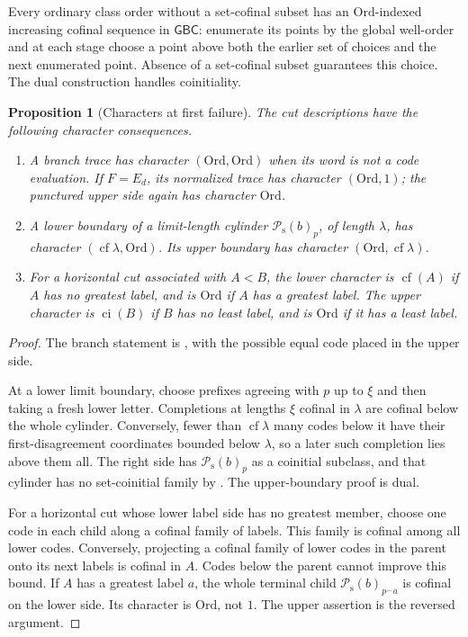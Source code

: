 \documentclass[11pt]{article}
\newtheorem{proposition}[proposition]{Proposition}
\theoremstyle{definition}
\theoremstyle{remark}
\newcommand{\Ord}{\mathrm{Ord}}
\newcommand{\Psupp}{\mathcal P_{\mathrm{s}}}
\newcommand{\cf}{\operatorname{cf}}
\newcommand{\cat}{\mathbin{{}^\frown}}
\newcommand{\GBC}{\mathsf{GBC}}
\newcommand{\ci}{\operatorname{ci}}
\begin{document}
Every ordinary class order without a set-cofinal subset has an
$\Ord$-indexed increasing cofinal sequence in $\GBC$: enumerate its
points by the global well-order and at each stage choose a point above
both the earlier set of choices and the next enumerated point. Absence
of a set-cofinal subset guarantees this choice. The dual construction
handles coinitiality.

\begin{proposition}[Characters at first failure]\label{swo:fs:prop:characters}
The cut descriptions have the following character consequences.
\begin{enumerate}[label=\textup{(\roman*)}]
\item A branch trace has character $(\Ord,\Ord)$ when its word is
not a code evaluation. If $F=E_d$, its normalized trace has character
$(\Ord,1)$; the punctured upper side again has character $\Ord$.
\item A lower boundary of a limit-length cylinder $\Psupp(b)_p$, of length
$\lambda$, has character $(\cf\lambda,\Ord)$. Its upper boundary
has character $(\Ord,\cf\lambda)$.
\item For a horizontal cut associated with $A<B$, the lower
character is $\cf(A)$ if $A$ has no greatest label, and is $\Ord$
if $A$ has a greatest label. The upper character is $\ci(B)$ if
$B$ has no least label, and is $\Ord$ if it has a least label.
\end{enumerate}
\end{proposition}
\begin{proof}
The branch statement is , with the
possible equal code placed in the upper side.

At a lower limit boundary, choose prefixes agreeing with $p$ up to
$\xi$ and then taking a fresh lower letter. Completions at lengths
$\xi$ cofinal in $\lambda$ are cofinal below the whole cylinder.
Conversely, fewer than $\cf\lambda$ many codes below it have their
first-disagreement coordinates bounded below $\lambda$, so a later
such completion lies above them all. The right side has $\Psupp(b)_p$ as a
coinitial subclass, and that cylinder has no set-coinitial family by
. The upper-boundary proof is dual.

For a horizontal cut whose lower label side has no greatest member,
choose one code in each child along a cofinal family of labels. This
family is cofinal among all lower codes. Conversely, projecting a
cofinal family of lower codes in the parent onto its next labels is
cofinal in $A$. Codes below the parent cannot improve this bound. If
$A$ has a greatest label $a$, the whole terminal child $\Psupp(b)_{p\cat a}$
is cofinal on the lower side. Its character is $\Ord$, not $1$.
The upper assertion is the reversed argument.
\end{proof}
\end{document}
